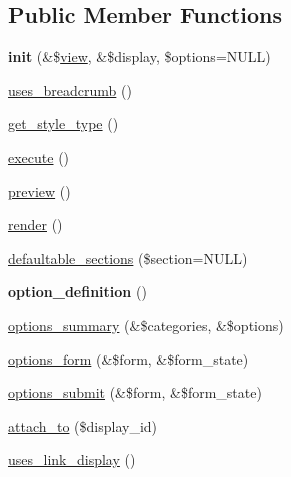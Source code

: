 \subsection*{Public Member Functions}
\begin{DoxyCompactItemize}
\item 
\hypertarget{classviews__plugin__display__feed_a3bec55bee6054fe0d5aef045840cd61f}{
{\bfseries init} (\&\$\hyperlink{classview}{view}, \&\$display, \$options=NULL)}
\label{classviews__plugin__display__feed_a3bec55bee6054fe0d5aef045840cd61f}

\item 
\hyperlink{classviews__plugin__display__feed_a4bc729e21f5578c13d420bbaf3c388c5}{uses\_\-breadcrumb} ()
\item 
\hyperlink{classviews__plugin__display__feed_a9a7886409056fe5906021a70d2f41c14}{get\_\-style\_\-type} ()
\item 
\hyperlink{classviews__plugin__display__feed_a6bfa566313f3f8fba85751554567e2dd}{execute} ()
\item 
\hyperlink{classviews__plugin__display__feed_ae5e20d2999e052f50486b5d03b4fb105}{preview} ()
\item 
\hyperlink{classviews__plugin__display__feed_a661fe08fd1be956d5b5cc40f36daf26b}{render} ()
\item 
\hyperlink{classviews__plugin__display__feed_aadbff7e4fb0bc05dfee8bc38ea1349dc}{defaultable\_\-sections} (\$section=NULL)
\item 
\hypertarget{classviews__plugin__display__feed_a9f737ab801100dafa8f1020c0737b598}{
{\bfseries option\_\-definition} ()}
\label{classviews__plugin__display__feed_a9f737ab801100dafa8f1020c0737b598}

\item 
\hyperlink{classviews__plugin__display__feed_a5c0b5faad36090985c85b16a454023a6}{options\_\-summary} (\&\$categories, \&\$options)
\item 
\hyperlink{classviews__plugin__display__feed_abe0a41d577b52de992279986d6c8c2d9}{options\_\-form} (\&\$form, \&\$form\_\-state)
\item 
\hyperlink{classviews__plugin__display__feed_ab7cca15934456ddb26045f03483899fb}{options\_\-submit} (\&\$form, \&\$form\_\-state)
\item 
\hyperlink{classviews__plugin__display__feed_aea8b688de38f11854afdb4194e87f59d}{attach\_\-to} (\$display\_\-id)
\item 
\hyperlink{classviews__plugin__display__feed_aa61e05dca3b82b696f6ea10356873a8b}{uses\_\-link\_\-display} ()
\end{DoxyCompactItemize}


